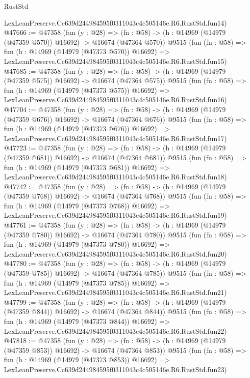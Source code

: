 \begin{lexlean}{RustStd}
\begin{coremodule}
    LexLeanPreserve.Cc639d244984595f0311043c4c505146e.R6.RustStd.fun14)
@47666 := @47358
    (fun (y : @28) =>
    (fn : @58) -> (h : @14969 (@14979 (@47359 @570)) @16692) -> @16674 (@47364 @570))
    @9515
    (fun (fn : @58) =>
    fun (h : @14969 (@14979 (@47373 @570)) @16692) =>
    LexLeanPreserve.Cc639d244984595f0311043c4c505146e.R6.RustStd.fun15)
@47685 := @47358
    (fun (y : @28) =>
    (fn : @58) -> (h : @14969 (@14979 (@47359 @575)) @16692) -> @16674 (@47364 @575))
    @9515
    (fun (fn : @58) =>
    fun (h : @14969 (@14979 (@47373 @575)) @16692) =>
    LexLeanPreserve.Cc639d244984595f0311043c4c505146e.R6.RustStd.fun16)
@47704 := @47358
    (fun (y : @28) =>
    (fn : @58) -> (h : @14969 (@14979 (@47359 @676)) @16692) -> @16674 (@47364 @676))
    @9515
    (fun (fn : @58) =>
    fun (h : @14969 (@14979 (@47373 @676)) @16692) =>
    LexLeanPreserve.Cc639d244984595f0311043c4c505146e.R6.RustStd.fun17)
@47723 := @47358
    (fun (y : @28) =>
    (fn : @58) -> (h : @14969 (@14979 (@47359 @681)) @16692) -> @16674 (@47364 @681))
    @9515
    (fun (fn : @58) =>
    fun (h : @14969 (@14979 (@47373 @681)) @16692) =>
    LexLeanPreserve.Cc639d244984595f0311043c4c505146e.R6.RustStd.fun18)
@47742 := @47358
    (fun (y : @28) =>
    (fn : @58) -> (h : @14969 (@14979 (@47359 @768)) @16692) -> @16674 (@47364 @768))
    @9515
    (fun (fn : @58) =>
    fun (h : @14969 (@14979 (@47373 @768)) @16692) =>
    LexLeanPreserve.Cc639d244984595f0311043c4c505146e.R6.RustStd.fun19)
@47761 := @47358
    (fun (y : @28) =>
    (fn : @58) -> (h : @14969 (@14979 (@47359 @780)) @16692) -> @16674 (@47364 @780))
    @9515
    (fun (fn : @58) =>
    fun (h : @14969 (@14979 (@47373 @780)) @16692) =>
    LexLeanPreserve.Cc639d244984595f0311043c4c505146e.R6.RustStd.fun20)
@47780 := @47358
    (fun (y : @28) =>
    (fn : @58) -> (h : @14969 (@14979 (@47359 @785)) @16692) -> @16674 (@47364 @785))
    @9515
    (fun (fn : @58) =>
    fun (h : @14969 (@14979 (@47373 @785)) @16692) =>
    LexLeanPreserve.Cc639d244984595f0311043c4c505146e.R6.RustStd.fun21)
@47799 := @47358
    (fun (y : @28) =>
    (fn : @58) -> (h : @14969 (@14979 (@47359 @844)) @16692) -> @16674 (@47364 @844))
    @9515
    (fun (fn : @58) =>
    fun (h : @14969 (@14979 (@47373 @844)) @16692) =>
    LexLeanPreserve.Cc639d244984595f0311043c4c505146e.R6.RustStd.fun22)
@47818 := @47358
    (fun (y : @28) =>
    (fn : @58) -> (h : @14969 (@14979 (@47359 @853)) @16692) -> @16674 (@47364 @853))
    @9515
    (fun (fn : @58) =>
    fun (h : @14969 (@14979 (@47373 @853)) @16692) =>
    LexLeanPreserve.Cc639d244984595f0311043c4c505146e.R6.RustStd.fun23)

\end{coremodule}
\end{lexlean}
